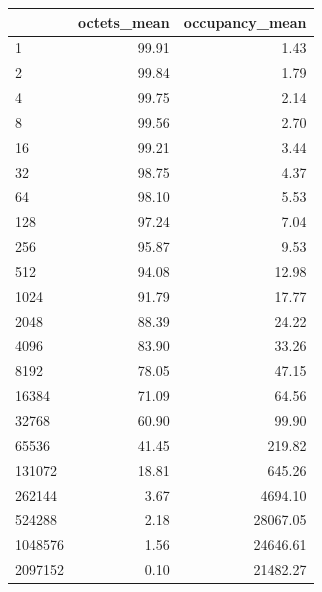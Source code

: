\begin{tabular}{lrr}
\toprule
 & octets_mean & occupancy_mean \\
\midrule
1 & 99.91 & 1.43 \\
2 & 99.84 & 1.79 \\
4 & 99.75 & 2.14 \\
8 & 99.56 & 2.70 \\
16 & 99.21 & 3.44 \\
32 & 98.75 & 4.37 \\
64 & 98.10 & 5.53 \\
128 & 97.24 & 7.04 \\
256 & 95.87 & 9.53 \\
512 & 94.08 & 12.98 \\
1024 & 91.79 & 17.77 \\
2048 & 88.39 & 24.22 \\
4096 & 83.90 & 33.26 \\
8192 & 78.05 & 47.15 \\
16384 & 71.09 & 64.56 \\
32768 & 60.90 & 99.90 \\
65536 & 41.45 & 219.82 \\
131072 & 18.81 & 645.26 \\
262144 & 3.67 & 4694.10 \\
524288 & 2.18 & 28067.05 \\
1048576 & 1.56 & 24646.61 \\
2097152 & 0.10 & 21482.27 \\
\bottomrule
\end{tabular}
